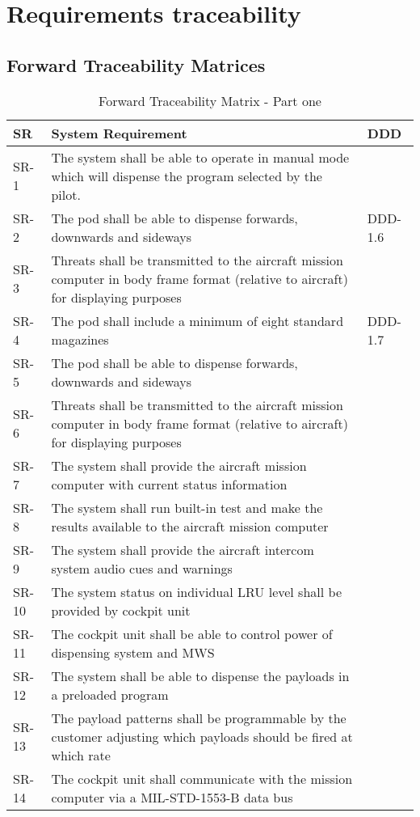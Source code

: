 \documentclass[Main]{subfiles}
\begin{document}
\chapter{Requirements traceability}


\section{Forward Traceability Matrices}

\begin{table}[htbp]
	\centering
	\begin{longtable}{p{} p{} p{}} \hline
	SR & System Requirement & DDD \\\hline
	SR-1 & The system shall be able to operate in manual mode which will dispense the program selected by the pilot. &  \\
	SR-2 & The pod shall be able to dispense forwards, downwards and sideways & DDD-1.6 \\
	SR-3 & Threats shall be transmitted to the aircraft mission computer in body frame format (relative to aircraft) for displaying purposes &  \\
	SR-4 & The pod shall include a minimum of eight standard magazines & DDD-1.7 \\
	SR-5 & The pod shall be able to dispense forwards, downwards and sideways & \\
	SR-6 & Threats shall be transmitted to the aircraft mission computer in body frame format
	(relative to aircraft) for displaying purposes &  \\
	SR-7 & The system shall provide the aircraft mission computer with current status information &  \\
	SR-8 &  The system shall run built-in test and make the results available to the aircraft mission
	computer &  \\
	SR-9 & The system shall provide the aircraft intercom system audio cues and warnings &  \\
	SR-10 &  The system status on individual LRU level shall be provided by cockpit unit &  \\
	SR-11 & The cockpit unit shall be able to control power of dispensing system and MWS &  \\
	SR-12 & The system shall be able to dispense the payloads in a preloaded program &  \\
	SR-13 & The payload patterns shall be programmable by the customer adjusting which payloads
	should be fired at which rate &  \\
	SR-14 & The cockpit unit shall communicate with the mission computer via a MIL-STD-1553-B
	data bus &  \\\hline
	\end{longtable}
\caption{Forward Traceability Matrix - Part one}
\label{Tab:ForwardPartOne}
\end{table}
\end{document}
